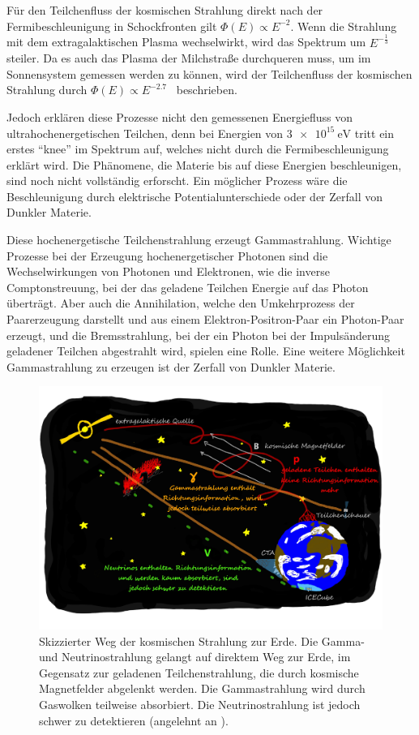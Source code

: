 Für den Teilchenfluss der kosmischen Strahlung direkt nach der Fermibeschleunigung in Schockfronten gilt
$\Phi(E)\propto E^{-2}$.
Wenn die Strahlung mit dem extragalaktischen Plasma wechselwirkt, wird das Spektrum um $E^{-\frac{1}{3}}$ steiler.
Da es auch das Plasma der Milchstraße durchqueren muss, um im Sonnensystem gemessen werden zu können, wird
der Teilchenfluss der kosmischen Strahlung durch $\Phi(E) \propto E^{-2.7}$~\cite[5]{Cosmic_rays} beschrieben.

Jedoch erklären diese Prozesse nicht den gemessenen Energiefluss von ultrahochenergetischen Teilchen, denn bei Energien von $\SI{3e15}{\eV}$ tritt ein erstes
\enquote{knee} im Spektrum auf, welches nicht durch die Fermibeschleunigung erklärt wird.
Die Phänomene, die Materie bis auf diese Energien beschleunigen, sind noch nicht vollständig erforscht.
Ein möglicher Prozess wäre die Beschleunigung durch elektrische Potentialunterschiede oder der Zerfall von Dunkler Materie.

Diese hochenergetische Teilchenstrahlung erzeugt Gammastrahlung.
Wichtige Prozesse bei der Erzeugung hochenergetischer Photonen sind die Wechselwirkungen von Photonen und Elektronen, wie
die inverse Comptonstreuung, bei der das geladene Teilchen Energie auf das Photon
überträgt. Aber auch die Annihilation, welche den Umkehrprozess der Paarerzeugung darstellt und aus einem Elektron-Positron-Paar
ein Photon-Paar erzeugt, und die Bremsstrahlung, bei der ein Photon bei der Impulsänderung geladener Teilchen abgestrahlt wird, spielen eine Rolle.
Eine weitere Möglichkeit Gammastrahlung zu erzeugen ist der Zerfall von Dunkler Materie.

\begin{figure}
  \includegraphics[width=\textwidth]{Plots/Folie5.pdf}
  \centering
  \caption{Skizzierter Weg der kosmischen Strahlung zur Erde. Die Gamma- und Neutrinostrahlung gelangt auf direktem Weg zur Erde, im Gegensatz
            zur geladenen Teilchenstrahlung, die durch kosmische Magnetfelder abgelenkt werden. Die Gammastrahlung wird durch Gaswolken teilweise
            absorbiert. Die Neutrinostrahlung ist jedoch schwer zu detektieren (angelehnt an \cite{Folie5}).}
  \label{abb:Folie5}
\end{figure}

